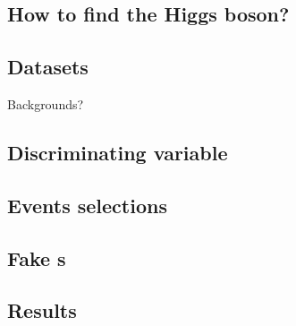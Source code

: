 \subsection*{How to find the Higgs boson?} 


\subsection*{Datasets}


\begin{frame}
\begin{center}
\LARGE Backgrounds?
\end{center}
\end{frame}
\addtocounter{framenumber}{-1}



\subsection*{Discriminating variable}


\subsection*{Events selections}


\subsection*{Fake \tauh s}


\subsection*{Results}
